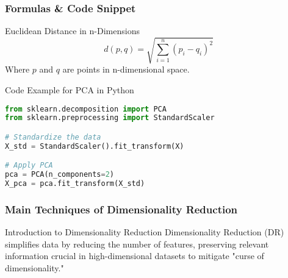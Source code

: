 \documentclass[aspectratio=169]{beamer}
\begin{document}
\begin{frame}[fragile]
    \frametitle{Formulas & Code Snippet}
    \begin{block}{Euclidean Distance in n-Dimensions}
        \begin{equation}
            d(p, q) = \sqrt{\sum_{i=1}^{n} (p_i - q_i)^2}
        \end{equation}
        Where \( p \) and \( q \) are points in n-dimensional space.
    \end{block}
    
    \begin{block}{Code Example for PCA in Python}
        \begin{lstlisting}[language=Python]
from sklearn.decomposition import PCA
from sklearn.preprocessing import StandardScaler

# Standardize the data
X_std = StandardScaler().fit_transform(X)

# Apply PCA
pca = PCA(n_components=2)
X_pca = pca.fit_transform(X_std)
        \end{lstlisting}
    \end{block}
\end{frame}

\begin{frame}[fragile]
    \frametitle{Main Techniques of Dimensionality Reduction}
    \begin{block}{Introduction to Dimensionality Reduction}
        Dimensionality Reduction (DR) simplifies data by reducing the number of features, preserving relevant information crucial in high-dimensional datasets to mitigate "curse of dimensionality."
    \end{block}
\end{frame}
\end{document}

